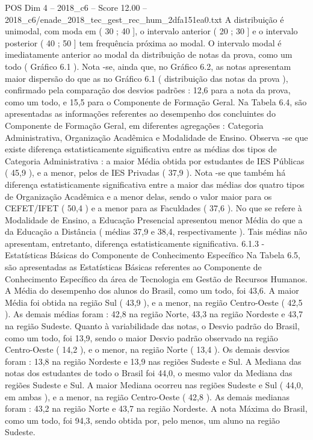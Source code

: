 \begin{textsample}{POS Dim 4 – 2018\_c6 – Score 12.00 – 2018\_c6/enade\_2018\_tec\_gest\_rec\_hum\_2dfa151ea0.txt}
A distribuição é unimodal, com moda em ( 30 ; 40 ], o intervalo anterior ( 20 ; 30 ] e o intervalo posterior ( 40 ; 50 ] tem frequência próxima ao modal.
O intervalo modal é imediatamente anterior ao modal da distribuição de notas da prova, como um todo ( Gráfico 6.1 ).
Nota -se, ainda que, no Gráfico 6.2, as notas apresentam maior dispersão do que as no Gráfico 6.1 ( distribuição das notas da prova ), confirmado pela comparação dos desvios padrões : 12,6 para a nota da prova, como um todo, e 15,5 para o Componente de Formação Geral.
Na Tabela 6.4, são apresentadas as informações referentes ao desempenho dos concluintes do Componente de Formação Geral, em diferentes agregações : Categoria Administrativa, Organização Acadêmica e Modalidade de Ensino.
Observa -se que existe diferença estatisticamente significativa entre as médias dos tipos de Categoria Administrativa : a maior Média obtida por estudantes de IES Públicas ( 45,9 ), e a menor, pelos de IES Privadas ( 37,9 ).
Nota -se que também há diferença estatisticamente significativa entre a maior das médias dos quatro tipos de Organização Acadêmica e a menor delas, sendo o valor maior para os CEFET/IFET ( 50,4 ) e a menor para as Faculdades ( 37,6 ).
No que se refere à Modalidade de Ensino, a Educação Presencial apresentou menor Média do que a da Educação a Distância ( médias 37,9 e 38,4, respectivamente ).
Tais médias não apresentam, entretanto, diferença estatisticamente significativa. 6.1.3 - Estatísticas Básicas do Componente de Conhecimento Específico Na Tabela 6.5, são apresentadas as Estatísticas Básicas referentes ao Componente de Conhecimento Específico da área de Tecnologia em Gestão de Recursos Humanos.
A Média do desempenho dos alunos do Brasil, como um todo, foi 43,6.
A maior Média foi obtida na região Sul ( 43,9 ), e a menor, na região Centro-Oeste ( 42,5 ).
As demais médias foram : 42,8 na região Norte, 43,3 na região Nordeste e 43,7 na região Sudeste.
Quanto à variabilidade das notas, o Desvio padrão do Brasil, como um todo, foi 13,9, sendo o maior Desvio padrão observado na região Centro-Oeste ( 14,2 ), e o menor, na região Norte ( 13,4 ).
Os demais desvios foram : 13,8 na região Nordeste e 13,9 nas regiões Sudeste e Sul.
A Mediana das notas dos estudantes de todo o Brasil foi 44,0, o mesmo valor da Mediana das regiões Sudeste e Sul.
A maior Mediana ocorreu nas regiões Sudeste e Sul ( 44,0, em ambas ), e a menor, na região Centro-Oeste ( 42,8 ).
As demais medianas foram : 43,2 na região Norte e 43,7 na região Nordeste.
A nota Máxima do Brasil, como um todo, foi 94,3, sendo obtida por, pelo menos, um aluno na região Sudeste.

\end{textsample}

